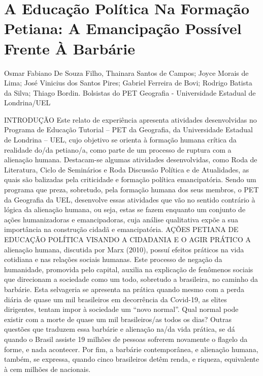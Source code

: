 
\section*{A Educação Política Na Formação Petiana: A Emancipação Possível Frente À Barbárie}

Osmar Fabiano De Souza Filho, Thainara Santos de Campos; Joyce Morais de Lima; José Vinicius dos Santos Pires;  Gabriel Ferreira de Bovi; Rodrigo Batista da Silva; Thiago Bordin.  Bolsistas do PET Geografia - Universidade Estadual de Londrina/UEL

INTRODUÇÃO
Este relato de experiência apresenta atividades desenvolvidas no Programa de Educação 
Tutorial – PET da Geografia, da Universidade Estadual de Londrina – UEL, cujo objetivo se
orienta à formação humana crítica da realidade do/da petiano/a, como parte de um processo de 
ruptura com a alienação humana. Destacam-se algumas atividades desenvolvidas, como Roda de 
Literatura, Ciclo de Seminários e Roda Discussão Política e de Atualidades, as quais são balizadas 
pela criticidade e formação política emancipatória. Sendo um programa que preza, sobretudo, pela 
formação humana dos seus membros, o PET da Geografia da UEL, desenvolve essas atividades 
que vão no sentido contrário à lógica da alienação humana, ou seja, estas se fazem enquanto um 
conjunto de ações humanizadoras e emancipadoras, cuja análise qualitativa expõe a sua
importância na construção cidadã e emancipatória.
AÇÕES PETIANA DE EDUCAÇÃO POLÍTICA VISANDO A CIDADANIA E O AGIR 
PRÁTICO 
A alienação humana, discutida por Marx (2010), possuí efeitos práticos na vida cotidiana 
e nas relações sociais humanas. Este processo de negação da humanidade, promovida pelo capital, 
auxilia na explicação de fenômenos sociais que direcionam a sociedade como um todo, sobretudo 
a brasileira, no caminho da barbárie. Esta selvageria se apresenta na prática quando mesmo com a 
perda diária de quase um mil brasileiros em decorrência da Covid-19, as elites dirigentes, tentam 
impor à sociedade um “novo normal”. Qual normal pode existir com a morte de quase um mil 
brasileiros/as todos os dias? Outras questões que traduzem essa barbárie e alienação na/da vida 
prática, se dá quando o Brasil assiste 19 milhões de pessoas sofrerem novamente o flagelo da 
forme, e nada acontecer. Por fim, a barbárie contemporânea, e alienação humana, também, se 
expressa, quando cinco brasileiros detêm renda, e riqueza, equivalente à cem milhões de nacionais. 
